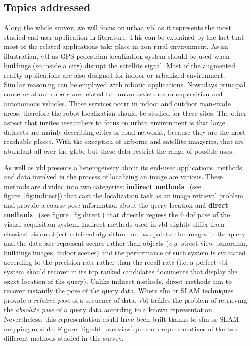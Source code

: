 	\subsection{Topics addressed}
		Along the whole survey, we will focus on urban \ac{vbl} as it represents the most studied end-user application in literature. This can be explained by the fact that most of the related applications take place in non-rural environment. As an illustration, \ac{vbl} as GPS pedestrian localization system should be used when buildings (so inside a city) disrupt the satellite signal. Most of the augmented reality applications are also designed for indoor or urbanized environment. Similar reasoning can be employed with robotic applications. Nowadays principal concerns about robots are related to human assistance or supervision and autonomous vehicles. Those services occur in indoor and outdoor man-made areas, therefore the robot localization should be studied for these sites. The other aspect that invites researchers to focus on urban environment is that large datasets are mainly describing cities or road networks, because they are the most reachable places. With the exception of airborne and satellite imageries, that are abundant all over the globe but these data restrict the range of possible uses.
				
		As well as \ac{vbl} presents a heterogeneity about its end-user applications, methods and data involved in the process of localizing an image are various. These methods are divided into two categories: \textbf{indirect methods}~\citep{Arandjelovic2012,Radenovic2016} (see figure~\ref{fig:indirect}) that cast the localization task as an image retrieval problem and provide a coarse pose information about the query location and \textbf{direct methods}~\citep{Kendall2015,Sattler2016a} (see figure~\ref{fig:direct}) that directly regress the 6 \ac{dof} pose of the visual acquisition system. Indirect methods used in \ac{vbl} slightly differ from classical vision object-retrieval algorithm~\citep{Sivic2003} on two points: the images in the query and the database represent scenes rather than objects (\textit{e.g.} street view panorama, buildings images, indoor scenes) and the performance of such system is evaluated according to the precision rate rather than the recall rate (i.e. a perfect \ac{vbl} system should recover in its top ranked candidates documents that display the exact location of the query). Unlike indirect methods, direct methods aim to recover instantly the pose of the query data. Where \ac{sfm} or SLAM techniques provide a \textit{relative pose} of a sequence of data, \ac{vbl} tackles the problem of retrieving the \textit{absolute pose} of a query data according to a known representation. Nevertheless, this representation could have been built thanks to \ac{sfm} or SLAM mapping module.
Figure~\ref{fig:vbl_overview} presents representatives of the two different methods studied in this survey.
			
